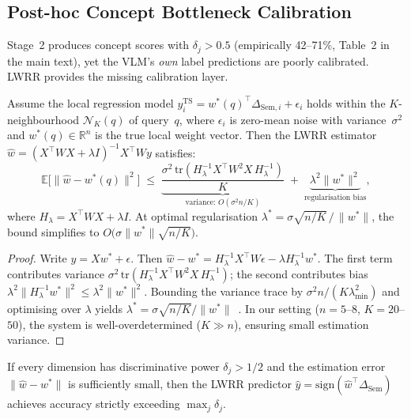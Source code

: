 \documentclass[runningheads]{llncs}
\begin{document}
\subsection{Post-hoc Concept Bottleneck Calibration}
\label{sec:theory_calibration}

Stage~2 produces concept scores with $\delta_j > 0.5$ (empirically 42--71\%, Table~2 in the main text), yet the VLM's \emph{own} label predictions are poorly calibrated.
LWRR provides the missing calibration layer.

\begin{theorem}\label{thm:calibration}
Assume the local regression model $y_i^{\mathrm{TS}} = w^{*\!}(q)^{\!\top} \Delta_{\mathrm{Sem},i} + \epsilon_i$ holds within the $K$-neighbourhood $\mathcal{N}_K(q)$ of query~$q$, where $\epsilon_i$ is zero-mean noise with variance~$\sigma^2$ and $w^{*}(q) \in \mathbb{R}^n$ is the true local weight vector.
Then the LWRR estimator $\hat{w} = (X^{\!\top}\!W\!X + \lambda I)^{-1}X^{\!\top}\!Wy$ satisfies:
\begin{equation}
\mathbb{E}\bigl[\|\hat{w} - w^{*\!}(q)\|^2\bigr]
\;\leq\;
\underbrace{\frac{\sigma^2\,\mathrm{tr}(H_\lambda^{-1}X^{\!\top}W^2\!X\,H_\lambda^{-1})}{K}}_{\text{variance: }O(\sigma^2 n/K)}
\;+\;
\underbrace{\lambda^2\|w^{*}\|^2}_{\text{regularisation bias}},
\label{eq:lwrr_bound}
\end{equation}
where $H_\lambda = X^{\!\top}\!W\!X + \lambda I$.
At optimal regularisation $\lambda^{*} = \sigma\sqrt{n/K}\,/\,\|w^{*}\|$, the bound simplifies to $O\!\bigl(\sigma\|w^{*}\|\sqrt{n/K}\bigr)$.
\end{theorem}

\begin{proof}
Write $y = Xw^{*} + \epsilon$.
Then $\hat{w} - w^{*} = H_\lambda^{-1}X^{\!\top}\!W\epsilon - \lambda H_\lambda^{-1}w^{*}$.
The first term contributes variance $\sigma^2\,\mathrm{tr}(H_\lambda^{-1}X^{\!\top}\!W^2\!X\,H_\lambda^{-1})$; the second contributes bias $\lambda^2\|H_\lambda^{-1}w^{*}\|^2 \leq \lambda^2\|w^{*}\|^2$.
Bounding the variance trace by $\sigma^2 n/(K\lambda_{\min}^2)$ and optimising over $\lambda$ yields $\lambda^{*} = \sigma\sqrt{n/K}/\|w^{*}\|$~\cite{caponnetto2007optimal,hoerl1970ridge}.
In our setting ($n{=}5$--$8$, $K{=}20$--$50$), the system is well-overdetermined ($K \gg n$), ensuring small estimation variance.
\end{proof}

\begin{corollary}\label{cor:calibration}
If every dimension has discriminative power $\delta_j > 1/2$ and the estimation error $\|\hat{w} - w^{*}\|$ is sufficiently small, then the LWRR predictor $\hat{y} = \mathrm{sign}(\hat{w}^{\!\top}\Delta_{\mathrm{Sem}})$ achieves accuracy strictly exceeding $\max_j \delta_j$.
\end{corollary}
\end{document}
